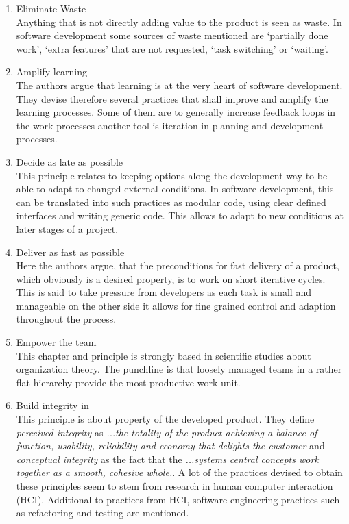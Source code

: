 \documentclass[a4paper,11pt,twoside]{article}
\begin{document}
\begin{enumerate}
\item Eliminate Waste\\
Anything that is not directly adding value to the product is seen as waste. In software development some sources of waste mentioned are `partially done work', `extra features' that are not requested, `task switching' or `waiting'. 

\item Amplify learning\\
The authors argue that learning is at the very heart of software development. They devise therefore several practices that shall improve and amplify the learning processes. Some of them are to generally increase feedback loops in the work processes another tool is iteration in planning and development processes. 

\item Decide as late as possible\\
This principle relates to keeping options along the development way to be able to adapt to changed external conditions. In software development, this can be translated into such practices as modular code, using clear defined interfaces and writing generic code. This allows to adapt to new conditions at later stages of a project.

\item Deliver as fast as possible\\
Here the authors argue, that the preconditions for fast delivery of a product, which obviously is a desired property, is to work on short iterative cycles. This is said to take pressure from developers as each task is small and manageable on the other side it allows for fine grained control and adaption throughout the process.

\item Empower the team\\
This chapter and principle is strongly based in scientific studies about organization theory. The punchline is that loosely managed teams in a rather flat hierarchy provide the most productive work unit.  

\item Build integrity in\\
This principle is about property of the developed product. They define \textit{perceived integrity} as \textit{...the totality of the product achieving a balance of function, usability, reliability and economy that delights the customer} and \textit{conceptual integrity} as the fact that the \textit{...systems central concepts work together as a smooth, cohesive whole.}. A lot of the practices devised to obtain these principles seem to stem from research in human computer interaction (HCI). Additional to practices from HCI, software engineering practices such as refactoring and testing are mentioned. 


\end{enumerate}
\end{document}
